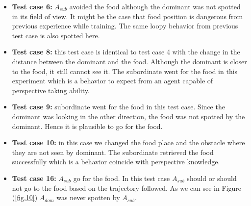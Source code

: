 \documentclass{article}
\begin{document}
\begin{itemize}
    \item \textbf {Test  case 6:} \(A_{sub}\) avoided the food although the dominant was not spotted in its field of view. It might be the case that food position is dangerous from previous experience while training. The same loopy behavior from previous test case is also spotted here.
    \item \textbf {Test  case 8:} this test case is identical to test case 4 with the change in the distance between the dominant and the food. Although the dominant is closer to the food, it still cannot see it. The subordinate went for the food in this experiment which is a behavior to expect from an agent capable of perspective taking ability.
    \item \textbf {Test  case 9:} subordinate went for the food in this test case. Since the dominant was looking in the other direction, the food was not spotted by the dominant. Hence it is plausible to go for the food.  
\item \textbf {Test  case 10:} in this case we changed the food place and the obstacle where they are not seen by dominant. The subordinate retrieved the food successfully which is a behavior coincide with perspective knowledge.
\item \textbf {Test  case 16:} \(A_{sub}\) go for the food. In this test case \(A_{sub}\) should or should not go to the food based on the trajectory followed. As we can see in Figure (\ref{fig.10}) \(A_{dom}\) was never spotten by \(A_{sub}\).
\end{itemize}
\end{document}
